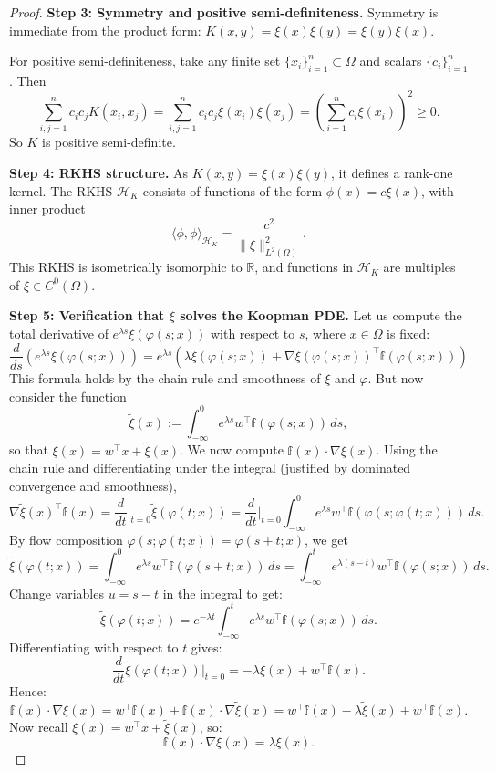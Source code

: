\documentclass[11pt]{article}
\theoremstyle{plain}
\def\[{\begin{equation}}
\def\]{\end{equation}}
\begin{document}
\begin{proof}
\medskip

\textbf{Step 3: Symmetry and positive semi-definiteness.}  
Symmetry is immediate from the product form: \( K(x, y) = \xi(x) \xi(y) = \xi(y) \xi(x) \).  

For positive semi-definiteness, take any finite set \( \{x_i\}_{i=1}^n \subset \Omega \) and scalars \( \{c_i\}_{i=1}^n \). Then
\[
\sum_{i,j=1}^n c_i c_j K(x_i, x_j) = \sum_{i,j=1}^n c_i c_j \xi(x_i) \xi(x_j) = \left( \sum_{i=1}^n c_i \xi(x_i) \right)^2 \ge 0.
\]
So \( K \) is positive semi-definite.

\medskip

\textbf{Step 4: RKHS structure.}  
As \( K(x, y) = \xi(x) \xi(y) \), it defines a rank-one kernel. The RKHS \( \mathcal{H}_K \) consists of functions of the form \( \phi(x) = c \xi(x) \), with inner product
\[
\langle \phi, \phi \rangle_{\mathcal{H}_K} = \frac{c^2}{\| \xi \|_{L^2(\Omega)}^2}.
\]
This RKHS is isometrically isomorphic to \( \mathbb{R} \), and functions in \( \mathcal{H}_K \) are multiples of \( \xi \in C^0(\Omega) \).

\medskip

\textbf{Step 5: Verification that \( \xi \) solves the Koopman PDE.}  
Let us compute the total derivative of \( e^{\lambda s} \xi(\varphi(s; x)) \) with respect to \( s \), where \( x \in \Omega \) is fixed:
\[
\frac{d}{ds} \left( e^{\lambda s} \xi(\varphi(s; x)) \right)
= e^{\lambda s} \left( \lambda \xi(\varphi(s; x)) + \nabla \xi(\varphi(s; x))^\top {\mathbb f}(\varphi(s; x)) \right).
\]
This formula holds by the chain rule and smoothness of \( \xi \) and \( \varphi \). But now consider the function
\[
\tilde{\xi}(x) := \int_{-\infty}^0 e^{\lambda s} w^\top {\mathbb f}(\varphi(s; x)) \, ds,
\]
so that \( \xi(x) = w^\top x + \tilde{\xi}(x) \). We now compute \( {\mathbb f}(x) \cdot \nabla \xi(x) \). Using the chain rule and differentiating under the integral (justified by dominated convergence and smoothness),
\[
\nabla \tilde{\xi}(x)^\top {\mathbb f}(x) = \frac{d}{dt}\bigg|_{t=0} \tilde{\xi}(\varphi(t; x))
= \frac{d}{dt}\bigg|_{t=0} \int_{-\infty}^0 e^{\lambda s} w^\top {\mathbb f}(\varphi(s; \varphi(t; x))) \, ds.
\]
By flow composition \( \varphi(s; \varphi(t; x)) = \varphi(s + t; x) \), we get
\[
\tilde{\xi}(\varphi(t; x)) = \int_{-\infty}^0 e^{\lambda s} w^\top {\mathbb f}(\varphi(s + t; x)) \, ds
= \int_{-\infty}^t e^{\lambda (s - t)} w^\top {\mathbb f}(\varphi(s; x)) \, ds.
\]
Change variables \( u = s - t \) in the integral to get:
\[
\tilde{\xi}(\varphi(t; x)) = e^{-\lambda t} \int_{-\infty}^t e^{\lambda s} w^\top {\mathbb f}(\varphi(s; x)) \, ds.
\]
Differentiating with respect to \( t \) gives:
\[
\frac{d}{dt} \tilde{\xi}(\varphi(t; x)) \bigg|_{t=0} = -\lambda \tilde{\xi}(x) + w^\top {\mathbb f}(x).
\]
Hence:
\[
{\mathbb f}(x) \cdot \nabla \xi(x) = w^\top {\mathbb f}(x) + {\mathbb f}(x) \cdot \nabla \tilde{\xi}(x) = w^\top {\mathbb f}(x) - \lambda \tilde{\xi}(x) + w^\top {\mathbb f}(x).
\]
Now recall \( \xi(x) = w^\top x + \tilde{\xi}(x) \), so:
\[
{\mathbb f}(x) \cdot \nabla \xi(x) = \lambda \xi(x).
\]


\end{proof}
\end{document}
